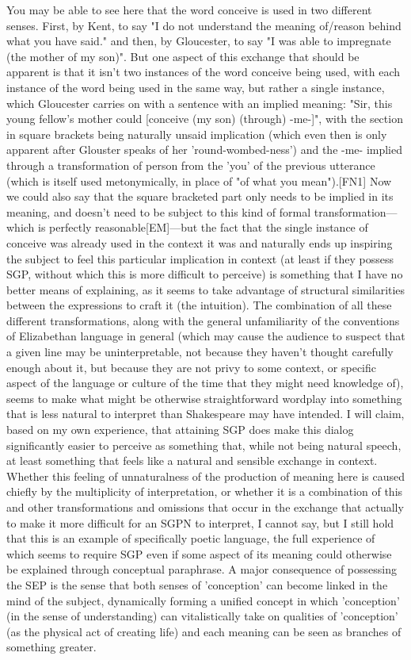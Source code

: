 \documentclass[]{article}
\begin{document}
You may be able to see here that the word conceive is used in two different senses. First, by Kent, to say "I do not understand the meaning of/reason behind what you have said." and then, by Gloucester, to say "I was able to impregnate (the mother of my son)". But one aspect of this exchange that should be apparent is that it isn't two instances of the word conceive being used, with each instance of the word being used in the same way, but rather a single instance, which Gloucester carries on with a sentence with an implied meaning: "Sir, this young fellow's mother could [conceive (my son) (through) -me-]", with the section in square brackets being naturally unsaid implication (which even then is only apparent after Glouster speaks of her 'round-wombed-ness') and the -me- implied through a transformation of person from the 'you' of the previous utterance (which is itself used metonymically, in place of "of what you mean").[FN1] Now we could also say that the square bracketed part only needs to be implied in its meaning, and doesn't need to be subject to this kind of formal transformation—which is perfectly reasonable[EM]—but the fact that the single instance of conceive was already used in the context it was and naturally ends up inspiring the subject to feel this particular implication in context (at least if they possess SGP, without which this is more difficult to perceive) is something that I have no better means of explaining, as it seems to take advantage of structural similarities between the expressions to craft it (the intuition). The combination of all these different transformations, along with the general unfamiliarity of the conventions of Elizabethan language in general (which may cause the audience to suspect that a given line may be uninterpretable, not because they haven't thought carefully enough about it, but because they are not privy to some context, or specific aspect of the language or culture of the time that they might need knowledge of), seems to make what might be otherwise straightforward wordplay into something that is less natural to interpret than Shakespeare may have intended. I will claim, based on my own experience, that attaining SGP does make this dialog significantly easier to perceive as something that, while not being natural speech, at least something that feels like a natural and sensible exchange in context. Whether this feeling of unnaturalness of the production of meaning here is caused chiefly by the multiplicity of interpretation, or whether it is a combination of this and other transformations and omissions that occur in the exchange that actually to make it more difficult for an SGPN to interpret,  I cannot say, but I still hold that this is an example of specifically poetic language, the full experience of which seems to require SGP even if some aspect of its meaning could otherwise be explained through conceptual paraphrase. A major consequence of possessing the SEP is the sense that both senses of 'conception' can become linked in the mind of the subject, dynamically forming a unified concept in which 'conception' (in the sense of understanding) can vitalistically take on qualities of 'conception' (as the physical act of creating life) and each meaning can be seen as branches of something greater.
\end{document}
